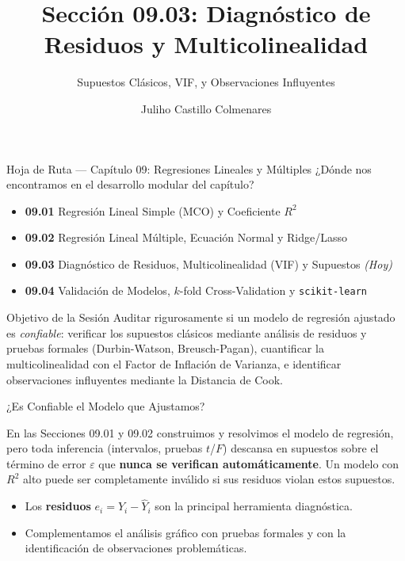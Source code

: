 \documentclass[10pt, aspectratio=169]{beamer}
\title[Diagnóstico de Regresión]{Sección 09.03: Diagnóstico de Residuos y Multicolinealidad}
\subtitle{Supuestos Clásicos, VIF, y Observaciones Influyentes}
\author[J. Castillo Colmenares]{Juliho Castillo Colmenares}
\institute{Tecnológico de Monterrey}
\date{\vspace{-1.2cm}}
\begin{document}
\begin{frame}[plain]
  \titlepage
\end{frame}

\begin{frame}{Hoja de Ruta --- Capítulo 09: Regresiones Lineales y Múltiples}
  \footnotesize
  ¿Dónde nos encontramos en el desarrollo modular del capítulo? \pause
  \begin{itemize}\itemsep=0.08em
    \item \textbf{09.01} Regresión Lineal Simple (MCO) y Coeficiente $R^2$ \pause
    \item \textbf{09.02} Regresión Lineal Múltiple, Ecuación Normal y Ridge/Lasso \pause
    \item \textbf{09.03} Diagnóstico de Residuos, Multicolinealidad (VIF) y Supuestos \emph{(Hoy)} \pause
    \item \textbf{09.04} Validación de Modelos, $k$-fold Cross-Validation y \texttt{scikit-learn}
  \end{itemize}
  \vspace{-0.05cm}
  \begin{block}{Objetivo de la Sesión}
    Auditar rigurosamente si un modelo de regresión ajustado es \emph{confiable}: verificar los supuestos clásicos mediante análisis de residuos y pruebas formales (Durbin-Watson, Breusch-Pagan), cuantificar la multicolinealidad con el Factor de Inflación de Varianza, e identificar observaciones influyentes mediante la Distancia de Cook.
  \end{block}
\end{frame}

\begin{frame}{¿Es Confiable el Modelo que Ajustamos?}
  \footnotesize
  \begin{motivacion}
    En las Secciones 09.01 y 09.02 construimos y resolvimos el modelo de regresión, pero toda inferencia (intervalos, pruebas $t$/$F$) descansa en supuestos sobre el término de error $\varepsilon$ que \textbf{nunca se verifican automáticamente}. Un modelo con $R^2$ alto puede ser completamente inválido si sus residuos violan estos supuestos.
  \end{motivacion}

  \vspace{0.15cm}
  \pause
  \begin{itemize}\itemsep=0.1cm
    \item Los \textbf{residuos} $e_i=Y_i-\hat Y_i$ son la principal herramienta diagnóstica. \pause
    \item Complementamos el análisis gráfico con pruebas formales y con la identificación de observaciones problemáticas.
  \end{itemize}
\end{frame}
\end{document}
